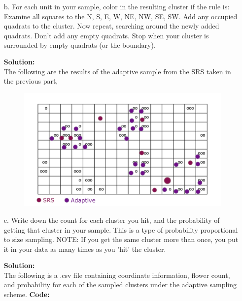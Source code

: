 \documentclass[12pt]{article}
\makeatletter
\theoremstyle{homework}
\newenvironment{exercise}[1]
{\def\@currentlabel{#1}\exercisecore}
{\endexercisecore}
\newcommand{\localhead}[1]{\par\smallskip\noindent\textbf{#1}\nobreak\\}%
\newcommand\solution{\localhead{Solution:}}
\makeatother
\begin{document}
\begin{exercise}{4}
\begin{enumerate}
\item[b.]  For each unit in your sample, color in the resulting cluster if the rule is:
 Examine all squares to the N, S, E, W, NE, NW, SE, SW. Add any occupied quadrats to the cluster.
  Now repeat, searching around the newly added quadrats.  Don't add any empty quadrats.
    Stop when your cluster is surrounded by empty quadrats (or the boundary).\\
    \solution The following are the results of the adaptive sample from the SRS taken in the previous part, 
    \begin{figure}[H]
      \begin{center}
      \includegraphics[width = .9\textwidth]{adaptivesampling01.png}
      \end{center}
    \end{figure}


    \item[c.]Write down the count for each cluster you hit, and the probability
     of getting that cluster in your sample. This is a type of probability
      proportional to size sampling.   NOTE:  If you get the same cluster
       more than once, you put it in your data as many times as you 'hit' the cluster.\\
       \solution The following is a .csv file containing coordinate information, flower count, and 
       probability for each of the sampled clusters under the adaptive sampling scheme. 
       \textbf{Code:}
       \begin{center}
          
       \end{center}
       \vspace{1in}


\end{enumerate}
\end{exercise}
\end{document}
